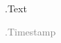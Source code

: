 \begin{flushright}
\colorbox{blue!20}{\parbox{0.7\textwidth}{ {{.Text}} }}

{\small\textcolor{gray}{ {{.Timestamp}} }}
\end{flushright}